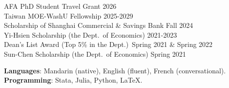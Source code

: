 \documentclass[a4paper, 11pt]{article}
\begin{document}

AFA PhD Student Travel Grant \hfill 2026\\
Taiwan MOE-WashU Fellowship \hfill 2025-2029\\
Scholarship of Shanghai Commercial \& Savings Bank  \hfill Fall 2024\\
Yi-Hsien Scholarship (the Dept.\ of Economics)  \hfill 2021-2023\\
Dean's List Award (Top 5\% in the Dept.)\ \hfill Spring 2021 \& Spring 2022 \\ 
Sun-Chen Scholarship (the Dept.\ of Economics) \hfill Spring 2021

\vspace{0.2em}

\newpage 


\textbf{Languages}: Mandarin (native), English (fluent), French (conversational).\\
\textbf{Programming}: {Stata, Julia, Python, \LaTeX}.
\end{document}

